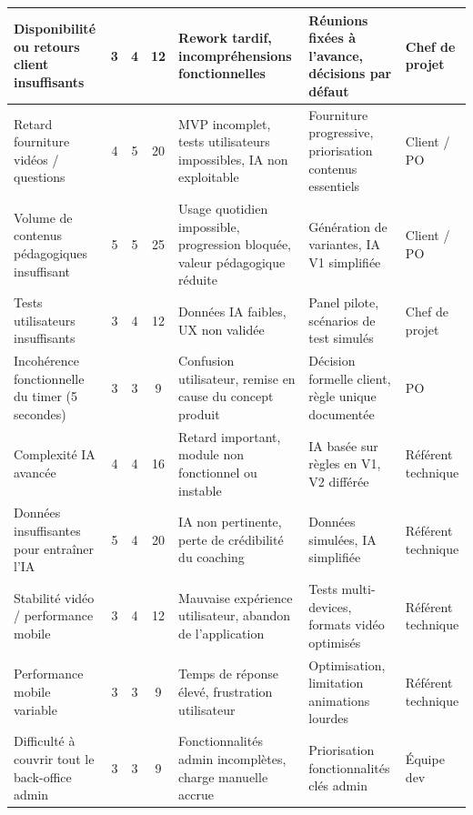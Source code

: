 \begin{longtable}{|p{3cm}|c|c|c|p{4.1cm}|p{4.1cm}|p{2.3cm}|}
Disponibilité ou retours client insuffisants
& 3 & 4 & 12
& Rework tardif, incompréhensions fonctionnelles
& Réunions fixées à l’avance, décisions par défaut
& Chef de projet \\ \hline

Retard fourniture vidéos / questions
& 4 & 5 & 20
& MVP incomplet, tests utilisateurs impossibles, IA non exploitable
& Fourniture progressive, priorisation contenus essentiels
& Client / PO \\ \hline

Volume de contenus pédagogiques insuffisant
& 5 & 5 & 25
& Usage quotidien impossible, progression bloquée, valeur pédagogique réduite
& Génération de variantes, IA V1 simplifiée
& Client / PO \\ \hline

Tests utilisateurs insuffisants
& 3 & 4 & 12
& Données IA faibles, UX non validée
& Panel pilote, scénarios de test simulés
& Chef de projet \\ \hline

Incohérence fonctionnelle du timer (5 secondes)
& 3 & 3 & 9
& Confusion utilisateur, remise en cause du concept produit
& Décision formelle client, règle unique documentée
& PO \\ \hline

Complexité IA avancée
& 4 & 4 & 16
& Retard important, module non fonctionnel ou instable
& IA basée sur règles en V1, V2 différée
& Référent technique \\ \hline

Données insuffisantes pour entraîner l’IA
& 5 & 4 & 20
& IA non pertinente, perte de crédibilité du coaching
& Données simulées, IA simplifiée
& Référent technique \\ \hline

Stabilité vidéo / performance mobile
& 3 & 4 & 12
& Mauvaise expérience utilisateur, abandon de l’application
& Tests multi-devices, formats vidéo optimisés
& Référent technique \\ \hline

Performance mobile variable
& 3 & 3 & 9
& Temps de réponse élevé, frustration utilisateur
& Optimisation, limitation animations lourdes
& Référent technique \\ \hline

Difficulté à couvrir tout le back-office admin
& 3 & 3 & 9
& Fonctionnalités admin incomplètes, charge manuelle accrue
& Priorisation fonctionnalités clés admin
& Équipe dev \\ \hline


\end{longtable}
